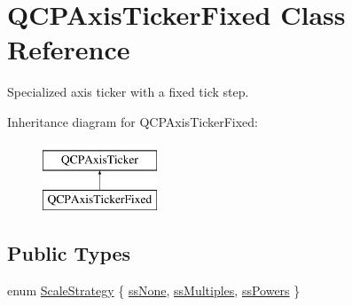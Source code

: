 \hypertarget{class_q_c_p_axis_ticker_fixed}{}\section{Q\+C\+P\+Axis\+Ticker\+Fixed Class Reference}
\label{class_q_c_p_axis_ticker_fixed}


Specialized axis ticker with a fixed tick step.  


Inheritance diagram for Q\+C\+P\+Axis\+Ticker\+Fixed\+:\begin{figure}[H]
\begin{center}
\leavevmode
\includegraphics[height=2.000000cm]{class_q_c_p_axis_ticker_fixed}
\end{center}
\end{figure}
\subsection*{Public Types}
\begin{DoxyCompactItemize}
\item 
enum \mbox{\hyperlink{class_q_c_p_axis_ticker_fixed_a15b3d38b935d404b1311eb85cfb6a439}{Scale\+Strategy}} \{ \mbox{\hyperlink{class_q_c_p_axis_ticker_fixed_a15b3d38b935d404b1311eb85cfb6a439a6621275677a05caa0de204ae3956b85f}{ss\+None}}, 
\mbox{\hyperlink{class_q_c_p_axis_ticker_fixed_a15b3d38b935d404b1311eb85cfb6a439a22f651785f6412645837421896561104}{ss\+Multiples}}, 
\mbox{\hyperlink{class_q_c_p_axis_ticker_fixed_a15b3d38b935d404b1311eb85cfb6a439ac39d5813e9165ebd494307ae61ce5dce}{ss\+Powers}}
 \}
\end{DoxyCompactItemize}

